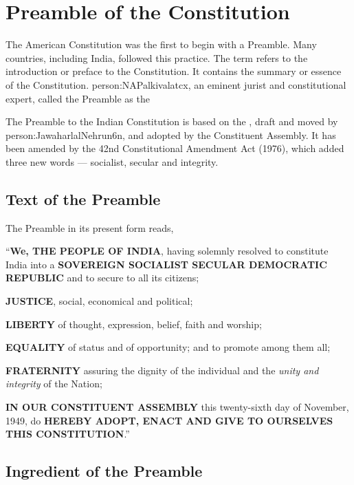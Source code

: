 \theendnotes
\cleardoublepage
\twocolumn

\chapter{Preamble of the Constitution}

The American Constitution was the first to begin with a Preamble. Many countries, including India, followed this practice. The term  refers to the introduction or preface to the Constitution. It contains the summary or essence of the Constitution. \gls{person:NAPalkivalatcx}, an eminent jurist and constitutional expert, called the Preamble as the 

The Preamble to the Indian Constitution is based on the , draft and moved by \gls{person:JawaharlalNehrun6n}, and adopted by the Constituent Assembly. It has been amended by the 42nd Constitutional Amendment Act (1976), which added three new words — socialist, secular and integrity.

\section{Text of the Preamble}

The Preamble in its present form reads,

\textquotedblleft \textbf{We, THE PEOPLE OF INDIA}, having solemnly resolved to constitute\\India into a \textbf{SOVEREIGN SOCIALIST SECULAR DEMOCRATIC REPUBLIC} and to secure to all its citizens;
\begin{list}{}{}
  \item \textbf{JUSTICE}, social, economical and political;
  \item \textbf{LIBERTY} of thought, expression, belief, faith and worship;
  \item \textbf{EQUALITY} of status and of opportunity; and to promote among them all;
  \item \textbf{FRATERNITY} assuring the dignity of the individual and the \textit{unity and integrity} of the Nation;
\end{list}
\textbf{IN OUR CONSTITUENT ASSEMBLY} this twenty-sixth day of November, 1949, do \textbf{HEREBY ADOPT, ENACT AND GIVE TO OURSELVES THIS CONSTITUTION}.\textquotedblright

\section{Ingredient of the Preamble}

